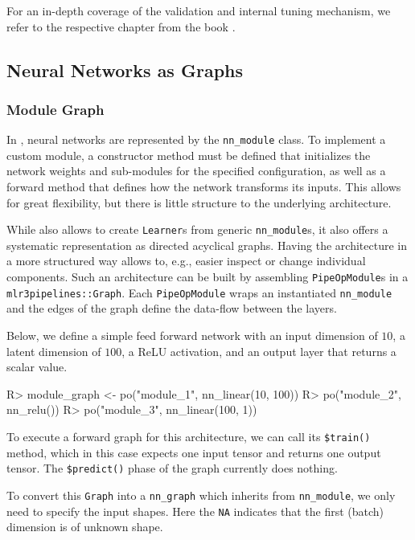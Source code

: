 \documentclass[article, nojss]{jss}
\theoremstyle{definition}
\begin{document}
For an in-depth coverage of the validation and internal tuning mechanism, we refer to the respective chapter from the   book \citep{ref-mlr3book-valid}.

\subsection{Neural Networks as Graphs}

\subsubsection{Module Graph}

In , neural networks are represented by the \texttt{nn\_module} class.
To implement a custom module, a constructor method must be defined that initializes the network weights and sub-modules for the specified configuration, as well as a forward method that defines how the network transforms its inputs.
This allows for great flexibility, but there is little structure to the underlying architecture.

While  also allows to create \texttt{Learner}s from generic \texttt{nn\_module}s, it also offers a systematic representation as directed acyclical graphs.
Having the architecture in a more structured way allows to, e.g., easier inspect or change individual components.
Such an architecture can be built by assembling \texttt{PipeOpModule}s in a \texttt{mlr3pipelines::Graph}.
Each \texttt{PipeOpModule} wraps an instantiated \texttt{nn\_module} and the edges of the graph define the data-flow between the layers.

Below, we define a simple feed forward network with an input dimension of $10$, a latent dimension of $100$, a ReLU activation, and an output layer that returns a scalar value.

\begin{CodeInput}
R> module_graph <- po("module_1", nn_linear(10, 100)) %
R>  po("module_2", nn_relu()) %
R>  po("module_3", nn_linear(100, 1))
\end{CodeInput}

To execute a forward graph for this architecture, we can call its \texttt{\$train()} method, which in this case expects one input tensor and returns one output tensor.
The \texttt{\$predict()} phase of the graph currently does nothing.

To convert this \texttt{Graph} into a \texttt{nn\_graph} which inherits from \texttt{nn\_module}, we only need to specify the input shapes.
Here the \texttt{NA} indicates that the first (batch) dimension is of unknown shape.
\end{document}
